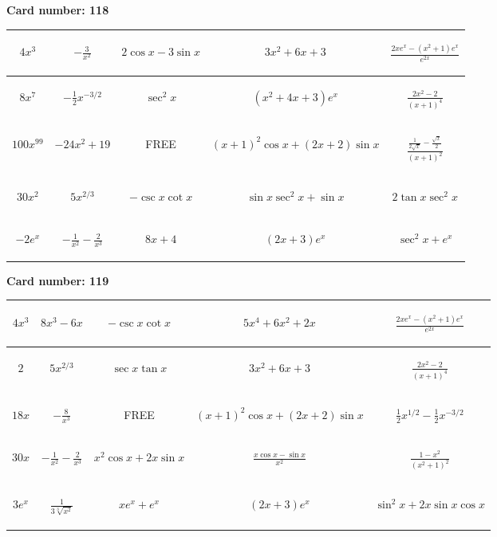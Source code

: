 \documentclass{article}
\newcommand{\entry}[1]{\begin{minipage}[t][2.75cm][t]{4cm} \vspace{1cm} \begin{center}#1\end{center} \end{minipage}}
\newcommand{\freespace}{\entry{FREE}}
\newcommand{\cardnumber}[1]{\noindent \textbf{Card number: #1} \bigskip}
\begin{document}
\pagebreak

\cardnumber{118}
\begin{center}
\begin{tabular}{|*{5}{c|}}
    \hline
    \entry{$4x^3$} & \entry{$-\frac{3}{x^2}$} & \entry{$2 \cos x - 3 \sin x$} & \entry{$3x^2 + 6x + 3$} & \entry{$\frac{2x e^x - (x^2 + 1) e^x}{e^{2x}}$} \\ \hline
    \entry{$8x^7$} & \entry{$-\frac{1}{2} x^{-3/2}$} & \entry{$\sec^2 x$} & \entry{$(x^2 + 4x + 3) e^x$} & \entry{$\frac{2x^2 - 2}{(x + 1)^4}$} \\ \hline
    \entry{$100x^{99}$} & \entry{$-24x^2 + 19$} & \freespace & \entry{$(x + 1)^2 \cos x + (2x + 2) \sin x$} & \entry{$\frac{\frac{1}{2 \sqrt{x}} - \frac{\sqrt{x}}{2}}{(x + 1)^2}$} \\ \hline
    \entry{$30x^2$} & \entry{$5x^{2/3}$} & \entry{$-\csc x \cot x$} & \entry{$\sin x \sec^2 x + \sin x$} & \entry{$2 \tan x \sec^2 x$} \\ \hline
    \entry{$-2e^x$} & \entry{$-\frac{1}{x^2} - \frac{2}{x^3}$} & \entry{$8x + 4$} & \entry{$(2x + 3) e^x$} & \entry{$\sec^2 x + e^x$} \\ \hline
\end{tabular}
\end{center}

\pagebreak

\cardnumber{119}
\begin{center}
\begin{tabular}{|*{5}{c|}}
    \hline
    \entry{$4x^3$} & \entry{$8x^3 - 6x$} & \entry{$-\csc x \cot x$} & \entry{$5x^4 + 6x^2 + 2x$} & \entry{$\frac{2x e^x - (x^2 + 1) e^x}{e^{2x}}$} \\ \hline
    \entry{$2$} & \entry{$5x^{2/3}$} & \entry{$\sec x \tan x$} & \entry{$3x^2 + 6x + 3$} & \entry{$\frac{2x^2 - 2}{(x + 1)^4}$} \\ \hline
    \entry{$18x$} & \entry{$-\frac{8}{x^3}$} & \freespace & \entry{$(x + 1)^2 \cos x + (2x + 2) \sin x$} & \entry{$\frac{1}{2} x^{1/2} - \frac{1}{2} x^{-3/2}$} \\ \hline
    \entry{$30x$} & \entry{$-\frac{1}{x^2} - \frac{2}{x^3}$} & \entry{$x^2 \cos x + 2x \sin x$} & \entry{$\frac{x \cos x - \sin x}{x^2}$} & \entry{$\frac{1 - x^2}{(x^2 + 1)^2}$} \\ \hline
    \entry{$3e^x$} & \entry{$\frac{1}{3\sqrt[3]{x^2}}$} & \entry{$x e^x + e^x$} & \entry{$(2x + 3) e^x$} & \entry{$\sin^2 x + 2x \sin x \cos x$} \\ \hline
\end{tabular}
\end{center}
\end{document}
